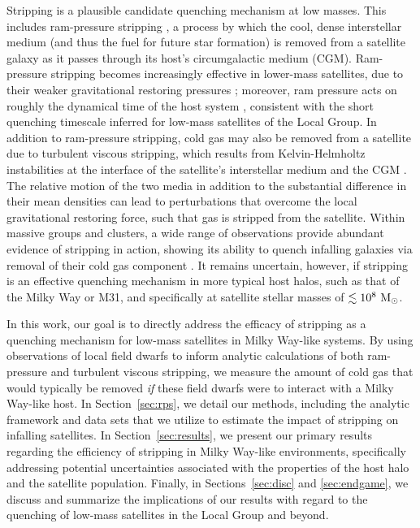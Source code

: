 \documentclass[usenatbib]{mn2e}
\newcommand{\msun}{{\rm M}_{\odot}}
\begin{document}
Stripping is a plausible candidate quenching mechanism at low
masses. This includes ram-pressure stripping \citep{gunn72}, a
process by which the cool, dense interstellar medium (and thus the
fuel for future star formation) is removed from a satellite galaxy as
it passes through its host's circumgalactic medium (CGM).
%
Ram-pressure stripping becomes increasingly effective in lower-mass
satellites, due to their weaker gravitational restoring pressures
\citep{hester06}; moreover, ram pressure acts on roughly the dynamical
time of the host system \citep[i.e.~$1-3$~Gyr,][]{tonnesen07,
  bekki14}, consistent with the short quenching timescale inferred for
low-mass satellites of the Local Group.
%
In addition to ram-pressure stripping, cold gas may also be removed
from a satellite due to turbulent viscous stripping, which results
from Kelvin-Helmholtz instabilities at the interface of the
satellite's interstellar medium and the CGM \citep{nulsen82}.
%
The relative motion of the two media in addition to the substantial
difference in their mean densities can lead to perturbations that
overcome the local gravitational restoring force, such that gas is
stripped from the satellite.
%
Within massive groups and clusters, a wide range of observations
provide abundant evidence of stripping in action, showing its ability
to quench infalling galaxies via removal of their cold gas component
\citep[e.g.][]{ebeling14, kenney15}.
%
It remains uncertain, however, if stripping is an
effective quenching mechanism in more typical host halos, such as that
of the Milky Way or M31, and specifically at satellite stellar masses
of $\lesssim10^{8}~\msun$.


In this work, our goal is to directly address the efficacy of
stripping as a quenching mechanism for low-mass satellites in Milky
Way-like systems. By using observations of local field dwarfs to
inform analytic calculations of both ram-pressure and turbulent
viscous stripping, we measure the amount of cold gas that would
typically be removed \emph{if} these field dwarfs were to interact
with a Milky Way-like host.
%
In Section~\ref{sec:rps}, we detail our methods, including the
analytic framework and data sets that we utilize to estimate the
impact of stripping on infalling satellites.
%
In Section~\ref{sec:results}, we present our primary results regarding
the efficiency of stripping in Milky Way-like environments,
specifically addressing potential uncertainties associated with the
properties of the host halo and the satellite population.
%
Finally, in Sections~\ref{sec:disc} and \ref{sec:endgame}, we discuss
and summarize the implications of our results with regard to the
quenching of low-mass satellites in the Local Group and beyond.
\end{document}

